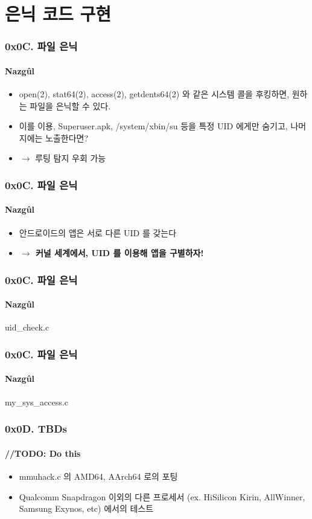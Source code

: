 \section[Section]{은닉 코드 구현}
\begin{frame}
  \frametitle{0x0C. 파일 은닉}
  \framesubtitle{Nazgûl}

  \begin{itemize}
  \item <1-> open(2), stat64(2), access(2), getdents64(2) 와 같은 시스템 콜을 후킹하면, 원하는 파일을 은닉할 수 있다.
  \item <2-> 이를 이용, Superuser.apk, /system/xbin/su 등을 특정 UID 에게만 숨기고, 나머지에는 노출한다면?
  \item <3-> $\rightarrow$ 루팅 탐지 우회 가능
  \end{itemize}
\end{frame}

\begin{frame}
  \frametitle{0x0C. 파일 은닉}
  \framesubtitle{Nazgûl}

  \begin{itemize}
  \item <1-> 안드로이드의 앱은 서로 다른 UID 를 갖는다
  \item <2-> \textbf{$\rightarrow$ 커널 세계에서, UID 를 이용해 앱을 구별하자!}
  \end{itemize}
\end{frame}

\begin{frame}
  \frametitle{0x0C. 파일 은닉}
  \framesubtitle{Nazgûl}

  {uid_check.c}
\end{frame}

\begin{frame}
  \frametitle{0x0C. 파일 은닉}
  \framesubtitle{Nazgûl}

  {my_sys_access.c}
\end{frame}

\begin{frame}
  \frametitle{0x0D. TBDs}
  \framesubtitle{//TODO: Do this}

  \begin{itemize}
  \item mmuhack.c 의 AMD64, AArch64 로의 포팅
  \item Qualcomm Snapdragon 이외의 다른 프로세서 (ex. HiSilicon Kirin, AllWinner, Samsung Exynos, etc) 에서의 테스트
  \end{itemize}
\end{frame}

